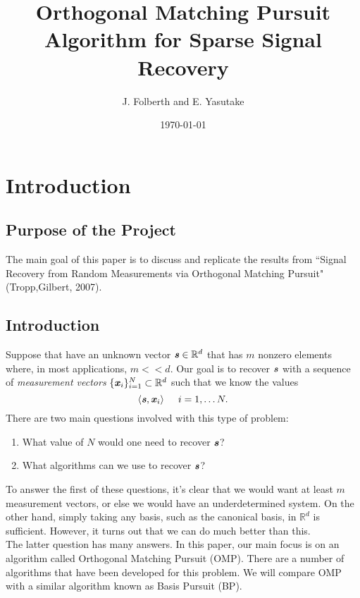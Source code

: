 \documentclass[12pt]{amsart}
\theoremstyle{plain}
\theoremstyle{plain}
\theoremstyle{plain}
\theoremstyle{plain}
\theoremstyle{plain}
\theoremstyle{plain}
\theoremstyle{plain}
\theoremstyle{plain}
\newcommand{\R}{\mathbb{R}}
\newcommand{\s}{\textbf{\emph{s}}}
\newcommand{\x}{\textbf{\emph{x}}}
\begin{document}
\title{Orthogonal Matching Pursuit Algorithm for Sparse Signal Recovery}
\author{J. Folberth and E. Yasutake}
\date{\today}
\maketitle


\tableofcontents

\section{Introduction}

\subsection{Purpose of the Project}
The main goal of this paper is to discuss and replicate the results from ``Signal Recovery from Random Measurements via Orthogonal Matching Pursuit" (Tropp,Gilbert, 2007). 

\subsection{Introduction}
Suppose that have an unknown vector $\s\in\R^d$ that has $m$ nonzero elements where, in most applications, $m<<d$.  Our goal is to recover $\s$ with a sequence of \emph{measurement vectors} $\{\x_i\}_{i=1}^N\subset\R^d$ such that we know the values 
	$$\langle \s,\x_i\rangle \hspace{0.2in} i=1,\ldots N.$$ 
There are two main questions involved with this type of problem:
	\begin{enumerate}
		\item What value of $N$ would one need to recover $\s$?
		\item What algorithms can we use to recover $\s$?\\
	\end{enumerate}
To answer the first of these questions, it's clear that we would want at least $m$ measurement vectors, or else we would have an underdetermined system.  On the other hand, simply taking any basis, such as the canonical basis, in $\R^d$ is sufficient.  However, it turns out that we can do much better than this. \\

The latter question has many answers.  In this paper, our main focus is on an algorithm called Orthogonal Matching Pursuit (OMP).  There are a number of algorithms that have been developed for this problem.  We will compare OMP with a similar algorithm known as Basis Pursuit (BP).
\end{document}
